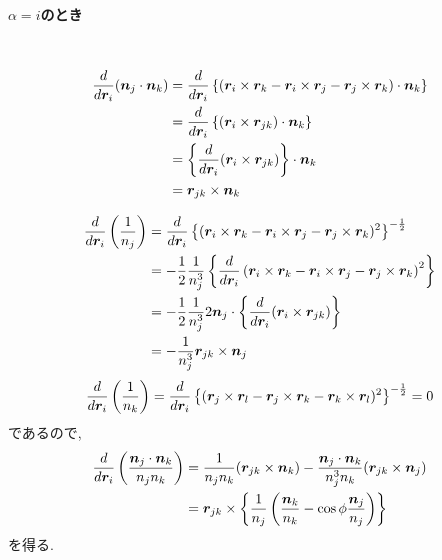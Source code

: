 \paragraph{$\alpha = i$のとき} \
\begin{align}
    \frac{d} {d \bm{r}_{i}} (\bm{n}_{j} \cdot \bm{n}_{k})
 &=
    \frac{d} {d \bm{r}_{i}}
    \left\{
           (  \bm{r}_{i} \times \bm{r}_{k}
            - \bm{r}_{i} \times \bm{r}_{j}
            - \bm{r}_{j} \times \bm{r}_{k}
            ) \cdot \bm{n}_{k}
   \right\}
 \notag \\
 &=
   \frac{d}{d \bm{r}_{i}}
   \left\{
           (\bm{r}_{i} \times \bm{r}_{jk}) \cdot \bm{n}_{k}
   \right\}
 \notag \\
 &=
   \left\{
          \frac{d}{d \bm{r}_{i}}
          (\bm{r}_{i} \times \bm{r}_{jk})
   \right\}
   \cdot \bm{n}_{k}
 \notag \\
 &=
   \bm{r}_{jk} \times \bm{n}_{k}
 \notag
\end{align}

\begin{align}
    \frac{d}{d \bm{r}_{i}} \left(\frac{1}{n_{j}} \right)
 &=
    \frac{d}{d \bm{r}_{i}}
    \left\{(  \bm{r}_{i} \times \bm{r}_{k}
            - \bm{r}_{i} \times \bm{r}_{j}
            - \bm{r}_{j} \times \bm{r}_{k} )^{2}
    \right\}^{-\frac{1}{2}}
 \notag \\
 &=
   -\frac{1}{2} \frac{1}{n_{j}^{3}}
    \left\{
           \frac{d}{d \bm{r}_{i}}
           \left(  \bm{r}_{i} \times \bm{r}_{k}
                 - \bm{r}_{i} \times \bm{r}_{j}
                 - \bm{r}_{j} \times \bm{r}_{k}
            \right)^{2}
    \right\}
 \notag \\
 &=
   - \frac{1}{2} \frac{1}{n_{j}^{3}}
    2\bm{n}_{j} \cdot
    \left\{
           \frac{d}{d \bm{r}_{i}} (\bm{r}_{i} \times \bm{r}_{jk})
    \right\}
 \notag \\
 &=
   - \frac{1}{n_{j}^{3}} \bm{r}_{jk} \times \bm{n}_{j}
\notag
\end{align}
\begin{align}
    \frac{d}{d \bm{r}_{i}} \left(\frac{1}{n_{k}} \right)
 =
    \frac{d}{d \bm{r}_{i}}
    \left\{(  \bm{r}_{j} \times \bm{r}_{l}
            - \bm{r}_{j} \times \bm{r}_{k}
            - \bm{r}_{k} \times \bm{r}_{l} )^{2}
    \right\}^{-\frac{1}{2}}
 =
   0
\notag
\end{align}
であるので, 
\begin{align}
     \frac{d}{d \bm{r}_{i}}
     \left( \frac{\bm{n}_{j} \cdot \bm{n}_{k}} {n_{j} n_{k}} \right)
 &=
     \frac{1}{n_{j}n_{k}} (\bm{r}_{jk} \times \bm{n}_{k})
   - \frac{\bm{n}_{j} \cdot \bm{n}_{k}}{n_{j}^{3}n_{k}} (\bm{r}_{jk} \times \bm{n}_j)
 \notag
 \\
 &=
     \bm{r}_{jk} \times
     \left\{
            \frac{1}{n_{j}}
            \left(
                   \frac{\bm{n}_{k}}{n_{k}} - \cos\phi \frac{\bm{n}_{j}}{n_{j}}
            \right)
     \right\}
\notag
\end{align}
を得る.
\\

